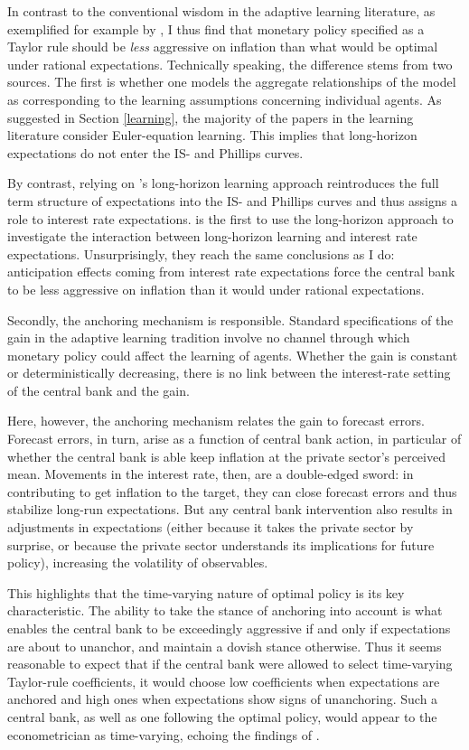 \documentclass[11pt]{article}
\renewcommand{\[}{\begin{equation}}
\renewcommand{\]}{\end{equation}}
\begin{document}
In contrast to the conventional wisdom in the adaptive learning literature, as exemplified for example by \cite{orphanides2004imperfect}, I thus find that monetary policy specified as a Taylor rule should be \emph{less} aggressive on inflation than what would be optimal under rational expectations. Technically speaking, the difference stems from two sources. The first is whether one models the aggregate relationships of the model as corresponding to the learning assumptions concerning individual agents. As suggested in Section \ref{learning}, the majority of the papers in the learning literature consider Euler-equation learning. This implies that long-horizon expectations do not enter the IS- and Phillips curves. 

By contrast, relying on \cite{preston2005}'s long-horizon learning approach reintroduces the full term structure of expectations into the IS- and Phillips curves and thus assigns a role to interest rate expectations. \cite{eusepi2018limits} is the first to use the long-horizon approach to investigate the interaction between long-horizon learning and interest rate expectations. Unsurprisingly, they reach the same conclusions as I do: anticipation effects coming from interest rate expectations force the central bank to be less aggressive on inflation than it would under rational expectations.

Secondly, the anchoring mechanism is responsible. Standard specifications of the gain in the adaptive learning tradition involve no channel through which monetary policy could affect the learning of agents. Whether the gain is constant or deterministically decreasing, there is no link between the interest-rate setting of the central bank and the gain. 

Here, however, the anchoring mechanism relates the gain to forecast errors. Forecast errors, in turn, arise as a function of central bank action, in particular of whether the central bank is able keep inflation at the private sector's perceived mean. Movements in the interest rate, then, are a double-edged sword: in contributing to get inflation to the target, they can close forecast errors and thus stabilize long-run expectations. But any central bank intervention also results in adjustments in expectations (either because it takes the private sector by surprise, or because the private sector understands its implications for future policy), increasing the volatility of observables.

This highlights that the time-varying nature of optimal policy is its key characteristic. The ability to take the stance of anchoring into account is what enables the central bank to be exceedingly aggressive if and only if expectations are about to unanchor, and maintain a dovish stance otherwise. Thus it seems reasonable to expect that if the central bank were allowed to select time-varying Taylor-rule coefficients, it would choose low coefficients when expectations are anchored and high ones when expectations show signs of unanchoring. Such a central bank, as well as one following the optimal policy, would appear to the econometrician as time-varying, echoing the findings of \cite{LUBIK201685}.
\end{document}
